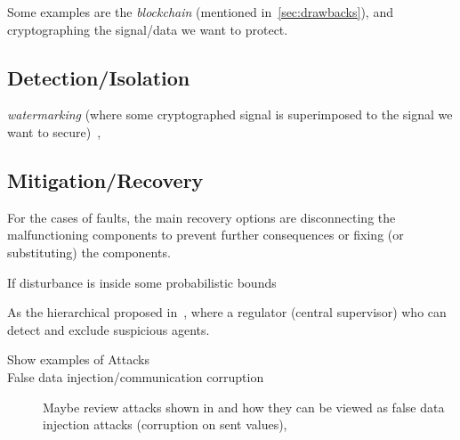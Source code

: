 \documentclass[../main.tex]{subfiles}
\begin{document}
Some examples are the \emph{blockchain} (mentioned in~\ref{sec:drawbacks}), and cryptographing the signal/data we want to protect.

\subsection{Detection/Isolation}
\emph{watermarking} (where some cryptographed signal is superimposed to the signal we want to secure)~\cite{MoEtAl2015,SatchidanandanKumar2017,KshetriVoas2017,LuciaEtAl2021},
\cite{FortiEtAl2016}

\subsection{Mitigation/Recovery}
For the cases of faults, the main recovery options are disconnecting the malfunctioning components to prevent further consequences or fixing (or substituting) the components.

If disturbance is inside some probabilistic bounds \cite{AnandutaEtAl2020}



As the hierarchical proposed in~\cite{BraunEtAl2020}, where a regulator (central supervisor) who can detect and exclude suspicious agents.


\begin{description}
  \item[Show examples of Attacks]
  \item[False data injection/communication corruption] Maybe review attacks shown in \cite{VelardeEtAl2017} and how they can be viewed as false data injection attacks (corruption on sent values), 
\end{description}
\end{document}
